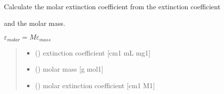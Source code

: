 \documentclass[letterpaper,10pt,english]{sphinxmanual}
\begin{document}

\begin{fulllineitems}
\label{\detokenize{03_absorption_coefficient:skinoptics.absorption_coefficient.molarext_from_ext}}
\pysigstartsignatures
{}
\pysigstopsignatures
\begin{DUlineblock}{0em}
\item[] Calculate the molar extinction coefficient from the extinction coefficient
\item[] and the molar mass.
\end{DUlineblock}

\sphinxAtStartPar
\(\varepsilon_{molar} = M \varepsilon_{mass}\)
\begin{quote}\begin{description}
\begin{itemize}
\item {} 
\sphinxAtStartPar
{} () \textendash{} extinction coefficient {[}cm\sphinxhyphen{}1 mL mg\sphinxhyphen{}1{]}

\item {} 
\sphinxAtStartPar
{} () \textendash{} molar mass {[}g mol\sphinxhyphen{}1{]}

\end{itemize}

\sphinxAtStartPar
\begin{itemize}
\item {} 
\sphinxAtStartPar
{} () \textendash{} molar extinction coefficient {[}cm\sphinxhyphen{}1 M\sphinxhyphen{}1{]}

\end{itemize}


\end{description}\end{quote}

\end{fulllineitems}
\end{document}
